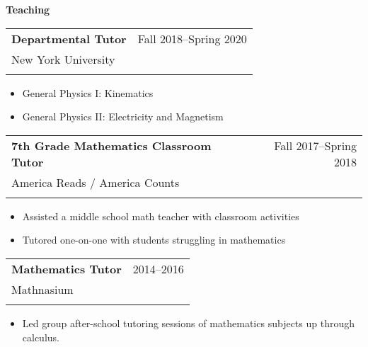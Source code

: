 \documentclass[letterpaper,10pt]{article}
\makeatletter
\newcounter{descounter}
\newcommand{\resetcounter}[0]{\setcounter{descounter}{0}}
\newcommand{\resitem}[1]{\item #1 \vspace{-6pt}}
\newcommand{\resheading}[1]{\resetcounter \vspace{15pt} {\Large \textbf{#1}} \\ \vspace{-8pt}
    \hrulefill\vspace{5pt}}
\newcommand{\ressubheading}[5]{
    \vspace{10pt}
    \begin{tabular*}{7.0in}{l@{\extracolsep{\fill}}r}
        \textbf{#1} & #2 \\
        #3 & #4 \\
        #5 & \\
    \end{tabular*}\vspace{-5pt}
}
\makeatother
\begin{document}
\resheading{Teaching}

    \ressubheading{Departmental Tutor}{Fall 2018--Spring 2020}{New York University}{}{}
    \vspace{-0.15in}

        \begin{itemize}
                \resitem{General Physics I: Kinematics}
                \resitem{General Physics II: Electricity and Magnetism}
        \end{itemize}

    \ressubheading{7th Grade Mathematics Classroom Tutor}{Fall 2017--Spring 2018}{America Reads / America Counts}{}{}
    \vspace{-0.15in}

        \begin{itemize}
            \resitem{Assisted a middle school math teacher with classroom activities}
            \resitem{Tutored one-on-one with students struggling in mathematics}
        \end{itemize}

    \ressubheading{Mathematics Tutor}{2014--2016}{Mathnasium}{}{}
    \vspace{-0.15in}

        \begin{itemize}
            \resitem{Led group after-school tutoring sessions of mathematics subjects up through calculus.}
        \end{itemize}
\end{document}
